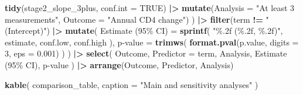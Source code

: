 \documentclass[
]{article}
\newenvironment{Shaded}{\begin{snugshade}}{\end{snugshade}}
\newcommand{\AttributeTok}[1]{\textcolor[rgb]{0.13,0.29,0.53}{#1}}
\newcommand{\ConstantTok}[1]{\textcolor[rgb]{0.56,0.35,0.01}{#1}}
\newcommand{\DecValTok}[1]{\textcolor[rgb]{0.00,0.00,0.81}{#1}}
\newcommand{\FloatTok}[1]{\textcolor[rgb]{0.00,0.00,0.81}{#1}}
\newcommand{\FunctionTok}[1]{\textcolor[rgb]{0.13,0.29,0.53}{\textbf{#1}}}
\newcommand{\NormalTok}[1]{#1}
\newcommand{\OtherTok}[1]{\textcolor[rgb]{0.56,0.35,0.01}{#1}}
\newcommand{\SpecialCharTok}[1]{\textcolor[rgb]{0.81,0.36,0.00}{\textbf{#1}}}
\newcommand{\StringTok}[1]{\textcolor[rgb]{0.31,0.60,0.02}{#1}}
\begin{document}
\begin{Shaded}
\begin{Highlighting}[]
  \FunctionTok{tidy}\NormalTok{(stage2\_slope\_3plus, }\AttributeTok{conf.int =} \ConstantTok{TRUE}\NormalTok{) }\SpecialCharTok{|\textgreater{}}
    \FunctionTok{mutate}\NormalTok{(}\AttributeTok{Analysis =} \StringTok{"At least 3 measurements"}\NormalTok{,}
           \AttributeTok{Outcome =} \StringTok{"Annual CD4 change"}\NormalTok{)}
\NormalTok{) }\SpecialCharTok{|\textgreater{}}
  \FunctionTok{filter}\NormalTok{(term }\SpecialCharTok{!=} \StringTok{"(Intercept)"}\NormalTok{) }\SpecialCharTok{|\textgreater{}}
  \FunctionTok{mutate}\NormalTok{(}
    \StringTok{\textasciigrave{}}\AttributeTok{Estimate (95\% CI)}\StringTok{\textasciigrave{}} \OtherTok{=} \FunctionTok{sprintf}\NormalTok{(}
      \StringTok{"\%.2f (\%.2f, \%.2f)"}\NormalTok{, estimate, conf.low, conf.high}
\NormalTok{    ),}
    \StringTok{\textasciigrave{}}\AttributeTok{p{-}value}\StringTok{\textasciigrave{}} \OtherTok{=} \FunctionTok{trimws}\NormalTok{(}
      \FunctionTok{format.pval}\NormalTok{(p.value, }\AttributeTok{digits =} \DecValTok{3}\NormalTok{, }\AttributeTok{eps =} \FloatTok{0.001}\NormalTok{)}
\NormalTok{    )}
\NormalTok{  ) }\SpecialCharTok{|\textgreater{}}
  \FunctionTok{select}\NormalTok{(}
\NormalTok{    Outcome, }\AttributeTok{Predictor =}\NormalTok{ term, Analysis,}
    \StringTok{\textasciigrave{}}\AttributeTok{Estimate (95\% CI)}\StringTok{\textasciigrave{}}\NormalTok{, }\StringTok{\textasciigrave{}}\AttributeTok{p{-}value}\StringTok{\textasciigrave{}}
\NormalTok{  ) }\SpecialCharTok{|\textgreater{}}
  \FunctionTok{arrange}\NormalTok{(Outcome, Predictor, Analysis)}

\FunctionTok{kable}\NormalTok{(}
\NormalTok{  comparison\_table,}
  \AttributeTok{caption =} \StringTok{"Main and sensitivity analyses"}
\NormalTok{)}
\end{Highlighting}
\end{Shaded}
\end{document}
